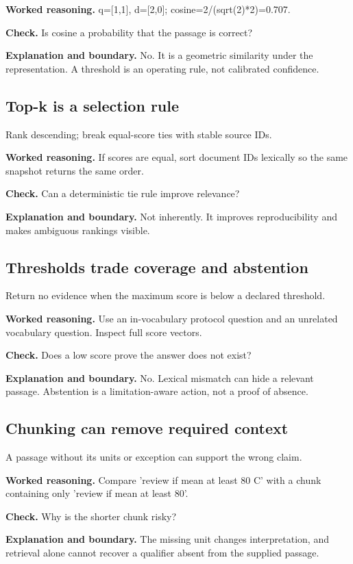 \textbf{Worked reasoning.} q=[1,1], d=[2,0]; cosine=2/(sqrt(2)*2)=0.707.

\textbf{Check.} Is cosine a probability that the passage is correct?

\textbf{Explanation and boundary.} No. It is a geometric similarity under the representation. A threshold is an operating rule, not calibrated confidence.

\subsection{Top-k is a selection rule}
Rank descending; break equal-score ties with stable source IDs.

\textbf{Worked reasoning.} If scores are equal, sort document IDs lexically so the same snapshot returns the same order.

\textbf{Check.} Can a deterministic tie rule improve relevance?

\textbf{Explanation and boundary.} Not inherently. It improves reproducibility and makes ambiguous rankings visible.

\subsection{Thresholds trade coverage and abstention}
Return no evidence when the maximum score is below a declared threshold.

\textbf{Worked reasoning.} Use an in-vocabulary protocol question and an unrelated vocabulary question. Inspect full score vectors.

\textbf{Check.} Does a low score prove the answer does not exist?

\textbf{Explanation and boundary.} No. Lexical mismatch can hide a relevant passage. Abstention is a limitation-aware action, not a proof of absence.

\subsection{Chunking can remove required context}
A passage without its units or exception can support the wrong claim.

\textbf{Worked reasoning.} Compare 'review if mean at least 80 C' with a chunk containing only 'review if mean at least 80'.

\textbf{Check.} Why is the shorter chunk risky?

\textbf{Explanation and boundary.} The missing unit changes interpretation, and retrieval alone cannot recover a qualifier absent from the supplied passage.

